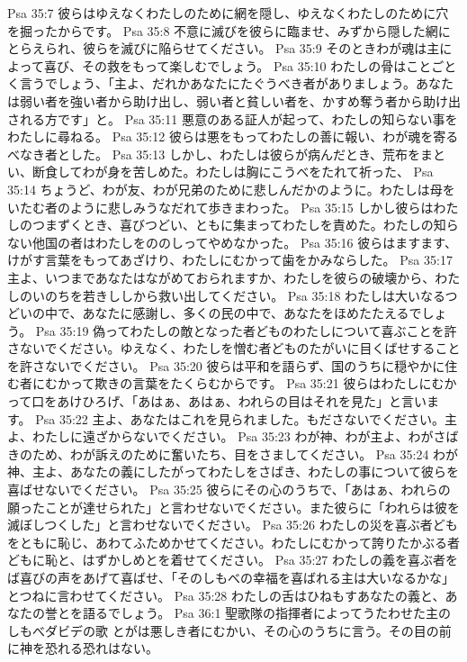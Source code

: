 Psa 35:7  彼らはゆえなくわたしのために網を隠し、ゆえなくわたしのために穴を掘ったからです。
Psa 35:8  不意に滅びを彼らに臨ませ、みずから隠した網にとらえられ、彼らを滅びに陥らせてください。
Psa 35:9  そのときわが魂は主によって喜び、その救をもって楽しむでしょう。
Psa 35:10  わたしの骨はことごとく言うでしょう、「主よ、だれかあなたにたぐうべき者がありましょう。あなたは弱い者を強い者から助け出し、弱い者と貧しい者を、かすめ奪う者から助け出される方です」と。
Psa 35:11  悪意のある証人が起って、わたしの知らない事をわたしに尋ねる。
Psa 35:12  彼らは悪をもってわたしの善に報い、わが魂を寄るべなき者とした。
Psa 35:13  しかし、わたしは彼らが病んだとき、荒布をまとい、断食してわが身を苦しめた。わたしは胸にこうべをたれて祈った、
Psa 35:14  ちょうど、わが友、わが兄弟のために悲しんだかのように。わたしは母をいたむ者のように悲しみうなだれて歩きまわった。
Psa 35:15  しかし彼らはわたしのつまずくとき、喜びつどい、ともに集まってわたしを責めた。わたしの知らない他国の者はわたしをののしってやめなかった。
Psa 35:16  彼らはますます、けがす言葉をもってあざけり、わたしにむかって歯をかみならした。
Psa 35:17  主よ、いつまであなたはながめておられますか、わたしを彼らの破壊から、わたしのいのちを若きししから救い出してください。
Psa 35:18  わたしは大いなるつどいの中で、あなたに感謝し、多くの民の中で、あなたをほめたたえるでしょう。
Psa 35:19  偽ってわたしの敵となった者どものわたしについて喜ぶことを許さないでください。ゆえなく、わたしを憎む者どものたがいに目くばせすることを許さないでください。
Psa 35:20  彼らは平和を語らず、国のうちに穏やかに住む者にむかって欺きの言葉をたくらむからです。
Psa 35:21  彼らはわたしにむかって口をあけひろげ、「あはぁ、あはぁ、われらの目はそれを見た」と言います。
Psa 35:22  主よ、あなたはこれを見られました。もださないでください。主よ、わたしに遠ざからないでください。
Psa 35:23  わが神、わが主よ、わがさばきのため、わが訴えのために奮いたち、目をさましてください。
Psa 35:24  わが神、主よ、あなたの義にしたがってわたしをさばき、わたしの事について彼らを喜ばせないでください。
Psa 35:25  彼らにその心のうちで、「あはぁ、われらの願ったことが達せられた」と言わせないでください。また彼らに「われらは彼を滅ぼしつくした」と言わせないでください。
Psa 35:26  わたしの災を喜ぶ者どもをともに恥じ、あわてふためかせてください。わたしにむかって誇りたかぶる者どもに恥と、はずかしめとを着せてください。
Psa 35:27  わたしの義を喜ぶ者をば喜びの声をあげて喜ばせ、「そのしもべの幸福を喜ばれる主は大いなるかな」とつねに言わせてください。
Psa 35:28  わたしの舌はひねもすあなたの義と、あなたの誉とを語るでしょう。
Psa 36:1  聖歌隊の指揮者によってうたわせた主のしもべダビデの歌 とがは悪しき者にむかい、その心のうちに言う。その目の前に神を恐れる恐れはない。
